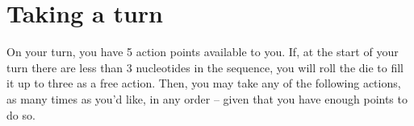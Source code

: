 \documentclass[a4paper,11pt,oneside]{memoir}
\begin{document}
%
%
%
%
%
%    
%
%
%    
%
%
%
%
%
%
%
%
%
%


\section*{Taking a turn}

On your turn, you have 5 action points available to you.
If, at the start of your turn there are less than 3 nucleotides in the sequence, you will roll the die to fill it up to three as a free action.
Then, you may take any of the following actions, as many times as you'd like, in any order -- given that you have enough points to do so.
\end{document}
